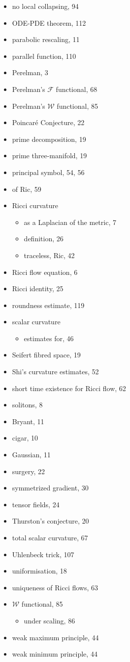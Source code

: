 \begin{itemize}
\item no local collapsing, 94
\item ODE-PDE theorem, 112
\item parabolic rescaling, 11
\item parallel function, 110
\item Perelman, 3
\item Perelman’s $\mathcal{F}$ functional, 68
\item Perelman’s $\mathcal{W}$ functional, 85
\item Poincaré Conjecture, 22
\item prime decomposition, 19
\item prime three-manifold, 19
\item principal symbol, 54, 56
\item of Ric, 59
\item Ricci curvature
\begin{itemize}
\item as a Laplacian of the metric, 7
\item definition, 26
\item traceless, Ric, 42
\end{itemize}
\item Ricci flow equation, 6
\item Ricci identity, 25
\item roundness estimate, 119
\item scalar curvature
\begin{itemize}
\item estimates for, 46
\end{itemize}
\item Seifert fibred space, 19
\item Shi’s curvature estimates, 52
\item short time existence for Ricci flow, 62
\item solitons, 8
\item Bryant, 11
\item cigar, 10
\item Gaussian, 11
\item surgery, 22
\item symmetrized gradient, 30
\item tensor fields, 24
\item Thurston’s conjecture, 20
\item total scalar curvature, 67
\item Uhlenbeck trick, 107
\item uniformisation, 18
\item uniqueness of Ricci flows, 63
\item $\mathcal{W}$ functional, 85
\begin{itemize}
\item under scaling, 86
\end{itemize}
\item weak maximum principle, 44
\item weak minimum principle, 44
\end{itemize}

